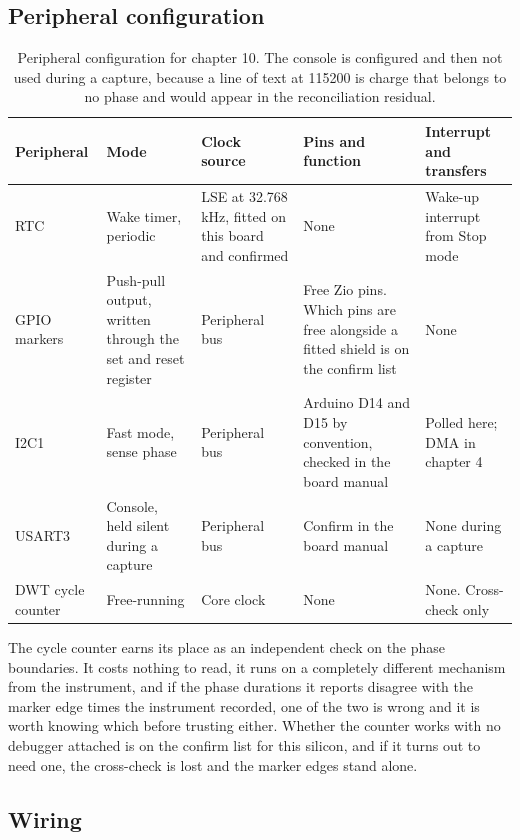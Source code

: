 \subsection*{Peripheral configuration}

\begin{table}[H]\centering\small
\begin{tabular}{p{22mm}p{26mm}p{24mm}p{30mm}p{30mm}}
\toprule
Peripheral & Mode & Clock source & Pins and function & Interrupt and transfers \\
\midrule
RTC & Wake timer, periodic & LSE at 32.768 kHz, fitted on this board and confirmed & None & Wake-up interrupt from Stop mode \\
GPIO markers & Push-pull output, written through the set and reset register & Peripheral bus & Free Zio pins. Which pins are free alongside a fitted shield is on the confirm list & None \\
I2C1 & Fast mode, sense phase & Peripheral bus & Arduino D14 and D15 by convention, checked in the board manual & Polled here; DMA in chapter 4 \\
USART3 & Console, held silent during a capture & Peripheral bus & Confirm in the board manual & None during a capture \\
DWT cycle counter & Free-running & Core clock & None & None. Cross-check only \\
\bottomrule
\end{tabular}
\caption{Peripheral configuration for chapter 10. The console is configured and then not used during a capture, because a line of text at 115200 is charge that belongs to no phase and would appear in the reconciliation residual.}
\end{table}

The cycle counter earns its place as an independent check on the phase
boundaries. It costs nothing to read, it runs on a completely different
mechanism from the instrument, and if the phase durations it reports disagree
with the marker edge times the instrument recorded, one of the two is wrong and
it is worth knowing which before trusting either. Whether the counter works
with no debugger attached is on the confirm list for this silicon, and if it
turns out to need one, the cross-check is lost and the marker edges stand alone.

\subsection*{Wiring}


